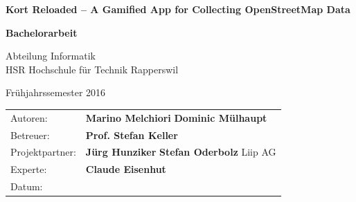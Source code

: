 \begin{titlepage}

\begin{figure}[H]
\hfill
{}
\end{figure}

\vspace{2cm}

\begin{center}
{ \Large
	\textbf{Kort Reloaded – A Gamified App for Collecting OpenStreetMap Data}
	\vspace{1cm}

	\textbf{Bachelorarbeit}
	\vspace{1cm}

	Abteilung Informatik \\[0.2cm]
	HSR Hochschule für Technik Rapperswil
	\vspace{1cm}

	Frühjahrssemester 2016
}
\end{center}
\vspace{1cm}


\begin{table}[H] 
\centering 
\begin{tabular}{p{0.19\twocelltabwidth}p{0.4\twocelltabwidth}}
Autoren: & \textbf{Marino Melchiori} \newline
\textbf{Dominic Mülhaupt} \\ 
Betreuer: & \textbf{Prof. Stefan Keller} \\ 
Projektpartner: & \textbf{Jürg Hunziker} \newline
\textbf{Stefan Oderbolz} \newline
Liip AG\\ 
Experte: & \textbf{Claude Eisenhut} \\ 
Datum: & \textbf{} \\ 
\end{tabular}
\end{table}

\end{titlepage}